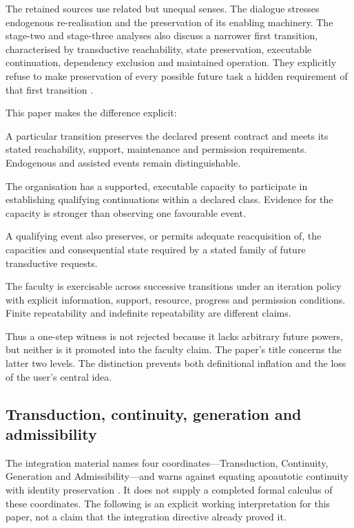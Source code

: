 The retained sources use related but unequal senses. The dialogue stresses endogenous re-realisation and the preservation of its enabling machinery. The stage-two and stage-three analyses also discuss a narrower first transition, characterised by transductive reachability, state preservation, executable continuation, dependency exclusion and maintained operation. They explicitly refuse to make preservation of every possible future task a hidden requirement of that first transition \cite[\S\S1--3,8]{S2}\cite[\S12]{S3}.

This paper makes the difference explicit:

\begin{description}[style=nextline,leftmargin=1.1em,labelindent=0pt]
\item[Continuation event.]
A particular transition preserves the declared present contract and meets its stated reachability, support, maintenance and permission requirements. Endogenous and assisted events remain distinguishable.
\item[Apoautotic faculty.]
The organisation has a supported, executable capacity to participate in establishing qualifying continuations within a declared class. Evidence for the capacity is stronger than observing one favourable event.
\item[Faculty-preserving transition.]
A qualifying event also preserves, or permits adequate reacquisition of, the capacities and consequential state required by a stated family of future transductive requests.
\item[Recursive apoautosis.]
The faculty is exercisable across successive transitions under an iteration policy with explicit information, support, resource, progress and permission conditions. Finite repeatability and indefinite repeatability are different claims.
\end{description}

Thus a one-step witness is not rejected because it lacks arbitrary future powers, but neither is it promoted into the faculty claim. The paper's title concerns the latter two levels. The distinction prevents both definitional inflation and the loss of the user's central idea.

\subsection{Transduction, continuity, generation and admissibility}

The integration material names four coordinates---Transduction, Continuity, Generation and Admissibility---and warns against equating apoautotic continuity with identity preservation \cite{REC}. It does not supply a completed formal calculus of these coordinates. The following is an explicit working interpretation for this paper, not a claim that the integration directive already proved it.

